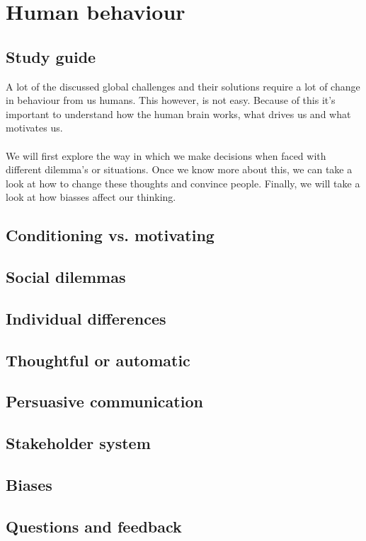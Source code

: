 \documentclass[../summary.tex]{subfiles}
\begin{document}
	\section{Human behaviour}
	
		\subsection{Study guide}
			A lot of the discussed global challenges and their solutions require a lot of change in behaviour from us humans. This however, is not easy. Because of this it's important to understand how the human brain works, what drives us and what motivates us. \\
			\\
			We will first explore the way in which we make decisions when faced with different dilemma's or situations. Once we know more about this, we can take a look at how to change these thoughts and convince people. Finally, we will take a look at how biasses affect our thinking. 
		\subsection{Conditioning vs. motivating}
		
		\subsection{Social dilemmas}
		
		\subsection{Individual differences}
		
		\subsection{Thoughtful or automatic}
		
		\subsection{Persuasive communication}
		
		\subsection{Stakeholder system}
		
		\subsection{Biases}
		
		\subsection{Questions and feedback}
\end{document}
